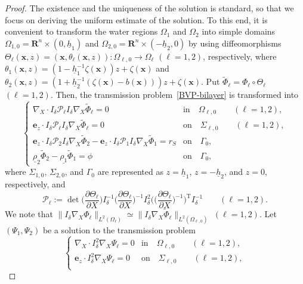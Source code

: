 \documentclass[11pt,leqno]{article}
\numberwithin{equation}{section}
\numberwithin{figure}{section}
\begin{document}
\begin{proof}
The existence and the uniqueness of the solution is standard, so that we focus on deriving the uniform estimate of the solution. 
To this end, it is convenient to transform the water regions $\Omega_1$ and $\Omega_2$ into simple domains 
$\Omega_{1,0}=\mathbf{R}^n\times(0,\underline{h}_1)$ and $\Omega_{2,0}=\mathbf{R}^n\times (-\underline{h}_2,0)$ by using diffeomorphisms 
$\Theta_\ell(\bm{x},z)=(\bm{x},\theta_\ell(\bm{x},z)) \colon \Omega_{\ell,0}\to\Omega_\ell$ $(\ell=1,2)$, respectively, 
where $\theta_1(\bm{x},z)=(1-\underline{h}_1^{-1}\zeta(\bm{x}))z+\zeta(\bm{x})$ and 
$\theta_2(\bm{x},z)=(1+\underline{h}_2^{-1}(\zeta(\bm{x})-b(\bm{x})))z+\zeta(\bm{x})$. 
Put $\tilde{\Phi}_\ell=\Phi_\ell\circ\Theta_\ell$ $(\ell=1,2)$. 
Then, the transmission problem~\eqref{BVP-bilayer} is transformed into 
%
\[
\begin{cases}
 \nabla_X\cdot I_\delta\mathcal{P}_\ell I_\delta\nabla_X\tilde{\Phi}_\ell = 0 & \mbox{in}\quad \Omega_{\ell,0} \qquad (\ell=1,2), \\
 \bm{e}_z\cdot I_\delta\mathcal{P}_\ell I_\delta\nabla_X\tilde{\Phi}_\ell = 0 & \mbox{on}\quad \Sigma_{\ell,0} \qquad (\ell=1,2), \\
 \bm{e}_z\cdot I_\delta\mathcal{P}_2 I_\delta\nabla_X\tilde{\Phi}_2
  -\bm{e}_z\cdot I_\delta\mathcal{P}_1 I_\delta\nabla_X\tilde{\Phi}_1 = r_S & \mbox{on}\quad \Gamma_0, \\
 \underline{\rho}_2\tilde{\Phi}_2-\underline{\rho_1}\tilde{\Phi}_1 = \phi & \mbox{on}\quad \Gamma_0,
\end{cases}
\]
%
where $\Sigma_{1,0}$, $\Sigma_{2,0}$, and $\Gamma_0$ are represented as $z=\underline{h}_1$, $z=-\underline{h}_2$, 
and $z=0$, respectively, and 
%
\[
\mathcal{P}_\ell
:= \det\biggl( \frac{\partial\Theta_\ell}{\partial X} \biggr)I_\delta^{-1}\biggl( \frac{\partial\Theta_\ell}{\partial X} \biggr)^{-1}
 I_\delta^2\biggl( \biggl( \frac{\partial\Theta_\ell}{\partial X} \biggr)^{-1} \biggr)^\mathrm{T}I_\delta^{-1}
 \qquad (\ell=1,2).
\]
%
We note that $\|I_\delta\nabla_X\Phi_\ell\|_{L^2(\Omega_\ell)}
 \simeq \|I_\delta\nabla_X\tilde{\Phi}_\ell\|_{L^2(\Omega_{\ell,0})}$ $(\ell=1,2)$. 
Let $(\Psi_1,\Psi_2)$ be a solution to the transmission problem 
%
\[
\begin{cases}
 \nabla_X\cdot I_\delta^2\nabla_X\Psi_\ell = 0 & \mbox{in}\quad \Omega_{\ell,0} \qquad (\ell=1,2), \\
 \bm{e}_z\cdot I_\delta^2\nabla_X\Psi_\ell = 0 & \mbox{on}\quad \Sigma_{\ell,0} \qquad (\ell=1,2), \\

\end{cases}\]
\end{proof}
\end{document}
